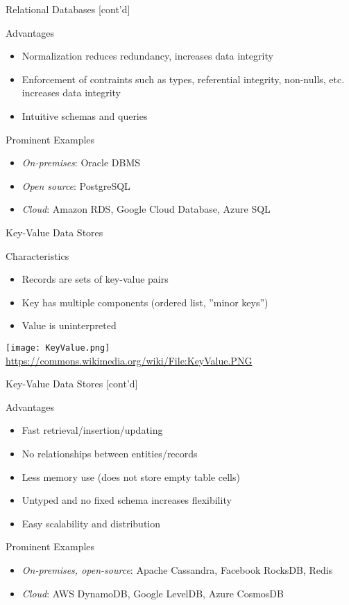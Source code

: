 \documentclass[ignorenonframetext,xcolor=x11names]{beamer}
\begin{document}
\begin{frame}{Relational Databases \small [cont'd]}
\begin{block}{Advantages}
\begin{itemize}
	\item Normalization reduces redundancy, increases data integrity
	\item Enforcement of contraints such as types, referential integrity, non-nulls, etc. increases data integrity
	\item Intuitive schemas and queries
\end{itemize}
\end{block}

\begin{block}{Prominent Examples}
\begin{itemize}
	\item \emph{On-premises}: Oracle DBMS
	\item \emph{Open source}: PostgreSQL
	\item \emph{Cloud}: Amazon RDS, Google Cloud Database, Azure SQL
\end{itemize}
\end{block}
\end{frame}

\begin{frame}{Key-Value Data Stores}
\begin{block}{Characteristics}
\begin{itemize}
	\item Records are sets of key-value pairs
	\item Key has multiple components (ordered list, ''minor keys'')
	\item Value is uninterpreted
\end{itemize}
\end{block}
\centering
\texttt{[image: KeyValue.png]}
\tiny{\url{https://commons.wikimedia.org/wiki/File:KeyValue.PNG}}
\end{frame}

\begin{frame}{Key-Value Data Stores \small [cont'd]}
\begin{block}{Advantages}
\begin{itemize}
	\item Fast retrieval/insertion/updating
	\item No relationships between entities/records
	\item Less memory use (does not store empty table cells)
	\item Untyped and no fixed schema increases flexibility
	\item Easy scalability and distribution
\end{itemize}
\end{block}
\begin{block}{Prominent Examples}
\begin{itemize}
	\item \emph{On-premises, open-source}: Apache Cassandra, Facebook RocksDB, Redis
	\item \emph{Cloud}: AWS DynamoDB, Google LevelDB, Azure CosmosDB
\end{itemize}
\end{block}
\end{frame}
\end{document}
